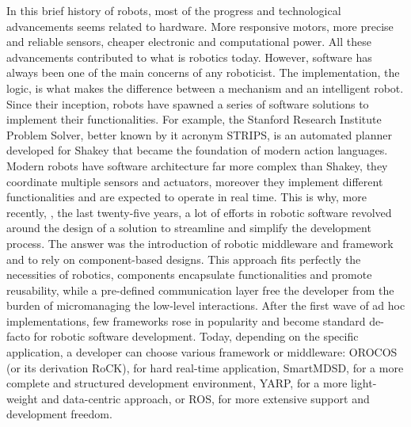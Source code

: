 In this brief history of robots, most of the progress and technological advancements seems related to hardware. More responsive motors, more precise and reliable sensors, cheaper electronic and computational power. All these advancements contributed to what is robotics today. However, software has always been one of the main concerns of any roboticist. The implementation, the logic, is what makes the difference between a mechanism and an intelligent robot. Since their inception, robots have spawned a series of software solutions to implement their functionalities. For example, the Stanford Research Institute Problem Solver, better known by it acronym STRIPS, is an automated planner developed for Shakey that became the foundation of modern action languages. Modern robots have software architecture far more complex than Shakey, they coordinate multiple sensors and actuators, moreover they implement different functionalities and are expected to operate in real time. This is why, more recently, \ie, the last twenty-five years, a lot of efforts in robotic software revolved around the design of a solution to streamline and simplify the development process. The answer was the introduction of robotic middleware and framework and to rely on component-based designs. This approach fits perfectly the necessities of robotics, components encapsulate functionalities and promote reusability, while a pre-defined communication layer free the developer from the burden of micromanaging the low-level interactions. After the first wave of ad hoc implementations, few frameworks rose in popularity and become standard de-facto for robotic software development. Today, depending on the specific application, a developer can choose various framework or middleware: OROCOS (or its derivation RoCK), for hard real-time application, SmartMDSD, for a more complete and structured development environment, YARP, for a more light-weight and data-centric approach, or ROS, for more extensive support and development freedom.

